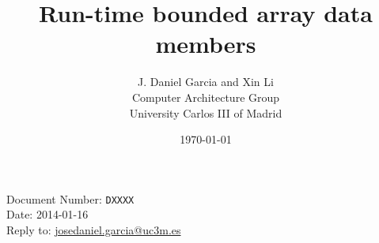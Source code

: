 \documentclass[10pt,a4paper,oneside,final,notitlepage,openright]{article}%
\begin{document}
\begin{flushright}
Document Number: \texttt{DXXXX}\\
Date: 2014-01-16\\
Reply to: \url{josedaniel.garcia@uc3m.es}
\end{flushright}

\title{Run-time bounded array data members}
\author{J. Daniel Garcia and Xin Li\\
Computer Architecture Group\\
University Carlos III of Madrid
}
\date{\today}

\begingroup
\let\newpage\relax%
\maketitle
\endgroup








\end{document}
